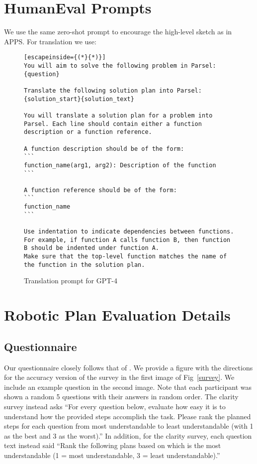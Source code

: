 \clearpage
\newpage
\section{HumanEval Prompts}
\label{humanprompts}
We use the same zero-shot prompt to encourage the high-level sketch as in APPS. For translation we use:

\begin{figure*}[h] 
\begin{lstlisting}[escapeinside={(*}{*)}]
You will aim to solve the following problem in Parsel:
{question}

Translate the following solution plan into Parsel:
{solution_start}{solution_text}

You will translate a solution plan for a problem into Parsel. Each line should contain either a function description or a function reference.

A function description should be of the form:
```
function_name(arg1, arg2): Description of the function
```

A function reference should be of the form:
```
function_name
```

Use indentation to indicate dependencies between functions. For example, if function A calls function B, then function B should be indented under function A.
Make sure that the top-level function matches the name of the function in the solution plan.
\end{lstlisting} 
\caption{Translation prompt for GPT-4}
\end{figure*}


\clearpage
\newpage
\section{Robotic Plan Evaluation Details}
\label{questionnaire}

\subsection{Questionnaire}
Our questionnaire closely follows that of \citet{huang2022language}. We provide a figure with the directions for the accuracy version of the survey in the first image of Fig~\ref{survey}. We include an example question in the second image. Note that each participant was shown a random 5 questions with their answers in random order. The clarity survey instead asks ``For every question below, evaluate how easy it is to understand how the provided steps accomplish the task. Please rank the planned steps for each question from most understandable to least understandable (with 1 as the best and 3 as the worst).'' In addition, for the clarity survey, each question text instead said ``Rank the following plans based on which is the most understandable (1 = most understandable, 3 = least understandable).''

